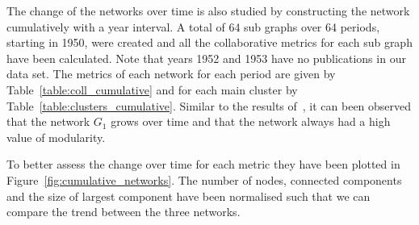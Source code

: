 \documentclass{article}
\theoremstyle{definition}
\begin{document}
The change of the networks over time is also studied by constructing the network
cumulatively with a year interval. A total of 64 sub graphs
over 64 periods, starting in 1950, were created and all the collaborative metrics
for each sub graph have been calculated. Note that years 1952 and 1953 have no
publications in our data set. The metrics of each network for each period are given by
Table~\ref{table:coll_cumulative} and for each main cluster by Table~\ref{table:clusters_cumulative}.
Similar to the results of~\cite{Liu2015}, it can been observed that the network \(G_1\)
grows over time and that the network always had a high value of modularity.

\begin{table}[!hbtp]
    \centering
    \begin{adjustbox}{totalheight=.8\baselineskip, width=\textwidth}
    }
    \caption{Collaborativeness metrics for cumulative graphs.}\label{table:coll_cumulative}
\end{adjustbox}
\end{table}

\begin{table}[!hbtp]
    \centering
    \begin{adjustbox}{totalheight=\baselineskip, width=\textwidth}
    }
    \caption{Collaborativeness metrics for cumulative graphs' main clusters.}\label{table:clusters_cumulative}
\end{adjustbox}
\end{table}

To better assess the change over time for each metric they have been plotted in
Figure~\ref{fig:cumulative_networks}. The number of nodes, connected components
and the size of largest component have been normalised such that we can compare
the trend between the three networks.
\end{document}
